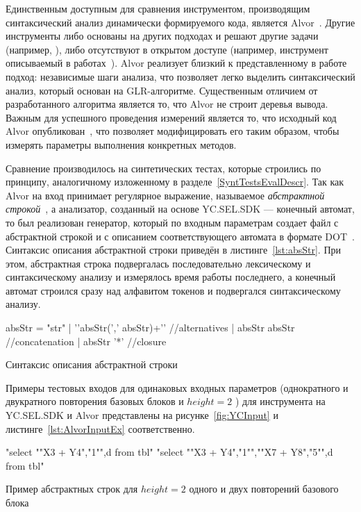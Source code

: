 Единственным доступным для сравнения инструментом, производящим синтаксический анализ динамически формируемого кода, является Alvor~\cite{Alvor1, Alvor2}. Другие инструменты либо основаны на других подходах и решают другие задачи (например, \cite{JSA,PHPSA}), либо отсутствуют в открытом доступе (например, инструмент описываемый в работах~\cite{LrAbstract1,LrAbstract2}). Alvor реализует  близкий к представленному в работе подход: независимые шаги анализа, что позволяет легко выделить синтаксический анализ, который основан на GLR-алгоритме. Существенным отличием от разработанного алгоритма является то, что Alvor не строит деревья вывода. Важным для успешного проведения измерений является то, что исходный код Alvor опубликован~\cite{AlvorUrl}, что позволяет модифицировать его таким образом, чтобы измерять параметры выполнения конкретных методов. 

Сравнение производилось на синтетических тестах, которые строились по принципу, аналогичному изложенному в разделе~\ref{SyntTestsEvalDescr}. Так как Alvor на вход принимает регулярное выражение, называемое \textit{абстрактной строкой}~\cite{Alvor2}, а анализатор, созданный на основе YC.SEL.SDK --- конечный автомат, то был реализован генератор, который по входным параметрам создает файл с абстрактной строкой и с описанием соответствующего автомата в формате DOT~\cite{DOT}. Синтаксис описания абстрактной строки приведён в листинге~\ref{lst:absStr}. При этом, абстрактная строка подвергалась последовательно лексическому и синтаксическому анализу и измерялось время работы последнего, а конечный автомат строился сразу над алфавитом токенов и подвергался синтаксическому анализу.

\begin{listing}
    \begin{pyglist}[numbers=left,numbersep=5pt]
absStr = "str"
       | '{'absStr(',' absStr)+'}' //alternatives
       | absStr absStr             //concatenation
       | absStr '*'                //closure
\end{pyglist}
\caption{Синтаксис описания абстрактной строки}
\label{lst:absStr}
\end{listing}

 
Примеры тестовых входов для одинаковых входных параметров (однократного и двукратного повторения базовых блоков и $height=2$ ) для инструмента на YC.SEL.SDK и Alvor представлены на рисунке~\ref{fig:YCInput} и листинге~\ref{lst:AlvorInputEx}  соответственно. 

\begin{listing}
    \begin{pyglist}[numbers=left,numbersep=5pt]
"select "{"X3 + Y4","1"}",d from tbl"
"select "{"X3 + Y4","1"}","{"X7 + Y8","5"}",d from tbl"
\end{pyglist}
\caption{Пример абстрактных строк для $height=2$ одного и двух повторений базового блока}
\label{lst:AlvorInputEx}
\end{listing}

